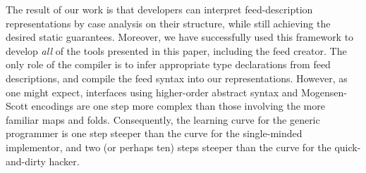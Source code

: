 The result of our work is that developers
can interpret feed-description representations by case analysis on
their structure, while still achieving the desired static
guarantees. Moreover, we have successfully used this framework to
develop {\it all} of the tools presented in this paper, including the
feed creator. The only role of the compiler is to infer appropriate
type declarations from feed descriptions, and compile the feed syntax
into our representations.  However, as one might expect, interfaces using
higher-order abstract syntax and Mogensen-Scott encodings are one step more
complex than those involving the more familiar maps and folds.  Consequently, the
learning curve for the generic programmer is one step steeper than
the curve for the single-minded implementor, and two (or perhaps ten) steps steeper
than the curve for the quick-and-dirty hacker.





